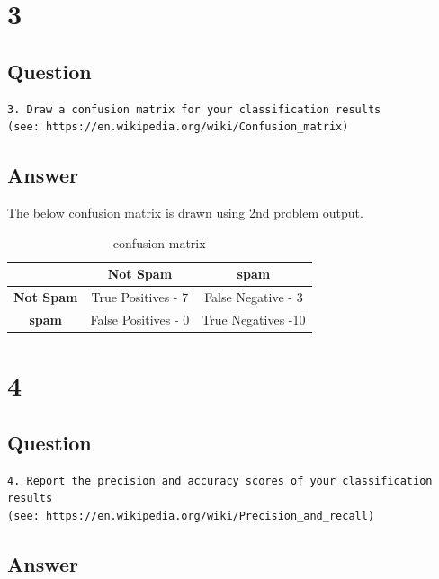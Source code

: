 \documentclass[letterpaper,11pt]{article}
\begin{document}
\section*{3}

\subsection*{Question}

\begin{verbatim}
3. Draw a confusion matrix for your classification results
(see: https://en.wikipedia.org/wiki/Confusion_matrix)
\end{verbatim}

\subsection*{Answer}

The below confusion matrix is drawn using 2nd problem output.
\begin{table}[htb]
\begin{tabular}{ | c | c | c | }
\hline
\textbf{} & \textbf{Not Spam} & \textbf{spam}  \\
\hline
\textbf{Not Spam} &True Positives - 7  & False Negative -  3 \\
\hline
\textbf{spam} &False Positives - 0 & True Negatives -10 \\
\hline
\end{tabular}
\caption{confusion matrix}
\label{table:q1user1}
\end{table}


\clearpage


\section*{4}

\subsection*{Question}

\begin{verbatim}
4. Report the precision and accuracy scores of your classification results
(see: https://en.wikipedia.org/wiki/Precision_and_recall)
\end{verbatim}

\subsection*{Answer}
\end{document}
